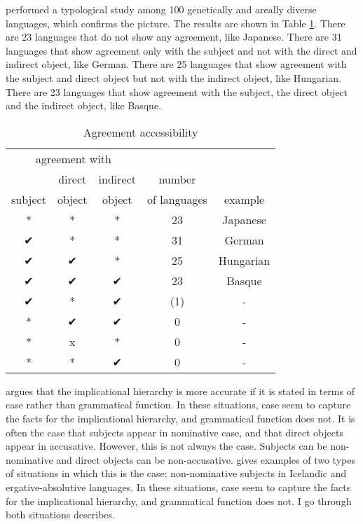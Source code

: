\citet{gilligan1987} performed a typological study among 100 genetically and areally diverse languages, which confirms the picture. The results are shown in Table \ref{tbl:agr-typo}. There are 23 languages that do not show any agreement, like Japanese. There are 31 languages that show agreement only with the subject and not with the direct and indirect object, like German. There are 25 languages that show agreement with the subject and direct object but not with the indirect object, like Hungarian. There are 23 languages that show agreement with the subject, the direct object and the indirect object, like Basque.

 \begin{table}[ht]
   \center
   \caption {Agreement accessibility}
     \begin{tabular}[t]{ccccc}
       \toprule
           \multicolumn{3}{c}{agreement with} &              &         \\
       \cmidrule{1-3}
                    & direct & indirect       & number       &         \\
           subject  & object & object         & of languages & example \\
       \cmidrule{1-3} \cmidrule{4-4} \cmidrule{5-5}
           *    & * & * & 23  & Japanese    \\
           ✔    & * & * & 31  & German     \\
           ✔    & ✔ & * & 25  & Hungarian  \\
           ✔    & ✔ & ✔ & 23  & Basque     \\
           ✔    & * & ✔ & (1) & -          \\
           {*}  & ✔ & ✔ & 0   & -          \\
           {*}  & x & * & 0   & -          \\
           {*}  & * & ✔ & 0   & -          \\
       \bottomrule
     \end{tabular}
     \label{tbl:agr-typo}
 \end{table}

\citet{bobaljik2006} argues that the implicational hierarchy is more accurate if it is stated in terms of case rather than grammatical function. In these situations, case seem to capture the facts for the implicational hierarchy, and grammatical function does not. It is often the case that subjects appear in nominative case, and that direct objects appear in accusative. However, this is not always the case. Subjects can be non-nominative and direct objects can be non-accusative. \citeauthor{bobaljik2006} gives examples of two types of situations in which this is the case: non-nominative subjects in Icelandic and ergative-absolutive languages. In these situations, case seem to capture the facts for the implicational hierarchy, and grammatical function does not. I go through both situations \citeauthor{bobaljik2006} describes.

